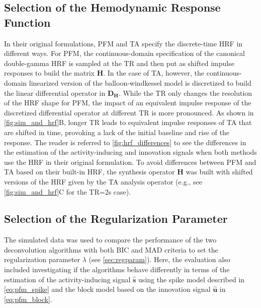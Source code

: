 \subsection{Selection of the Hemodynamic Response Function}

In their original formulations, PFM and TA specify the discrete-time HRF in
different ways. For PFM, the continuous-domain specification of the canonical
double-gamma HRF \citep{Henson2007CHAPTER14Convolution} is sampled at the TR and
then put as shifted impulse responses to build the matrix $\mathbf{H}$.  In the
case of TA, however, the continuous-domain linearized version of the
balloon-windkessel model is discretized to build the linear differential
operator in $\mathbf{D_H}$. While the TR only changes the resolution of the HRF
shape for PFM, the impact of an equivalent impulse response of the discretized
differential operator at different TR is more pronounced. As shown in
\cref{fig:sim_and_hrf}B, longer TR leads to equivalent impulse responses of TA
that are shifted in time, provoking a lack of the initial baseline and rise of
the response. The reader is referred to \cref{fig:hrf_differences} to see the
differences in the estimation of the activity-inducing and innovation signals
when both methods use the HRF in their original formulation. To avoid
differences between PFM and TA based on their built-in HRF, the synthesis
operator $\mathbf{H}$ was built with shifted versions of the HRF given by the TA
analysis operator (e.g., see \cref{fig:sim_and_hrf}C for the TR=2s case).

\subsection{Selection of the Regularization Parameter}

The simulated data was used to compare the performance of the two deconvolution
algorithms with both BIC and MAD criteria to set the regularization parameter
$\lambda$ (see \cref{sec:regparam}). Here, the evaluation also included
investigating if the algorithms behave differently in terms of the estimation of
the activity-inducing signal $\mathbf{\hat{s}}$ using the spike model described
in \cref{eq:pfm_spike} and the block model based on the innovation signal
$\mathbf{\hat{u}}$ in \cref{eq:pfm_block}.


